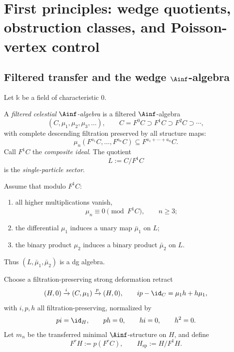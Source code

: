 \section{First principles: wedge quotients, obstruction classes, and Poisson-vertex control}
\label{sec:cbt-first-principles}

\subsection{Filtered transfer and the wedge $\Ainf$-algebra}
\label{sec:cbt-filtered-transfer}

Let $\mathbb{k}$ be a field of characteristic $0$.

\begin{definition}
\label{def:cbt-filtered-celestial}
A \emph{filtered celestial $\Ainf$-algebra} is a filtered $\Ainf$-algebra
\[
(C,\mu_1,\mu_2,\mu_3,\ldots),
\qquad
C=F^0C\supset F^1C\supset F^2C\supset \cdots,
\]
with complete descending filtration preserved by all structure maps:
\[
\mu_n(F^{a_1}C,\dots,F^{a_n}C)\subseteq F^{a_1+\cdots+a_n}C.
\]
Call $F^1C$ the \emph{composite ideal}. The quotient
\[
L:=C/F^1C
\]
is the \emph{single-particle sector}.
\end{definition}

Assume that modulo $F^1C$:
\begin{enumerate}[label=\textup{(\roman*)},leftmargin=2em]
\item all higher multiplications vanish,
\[
\mu_n\equiv 0 \pmod{F^1C},
\qquad n\geq 3;
\]
\item the differential $\mu_1$ induces a unary map $\bar\mu_1$ on $L$;
\item the binary product $\mu_2$ induces a binary product $\bar\mu_2$ on $L$.
\end{enumerate}
Thus $(L,\bar\mu_1,\bar\mu_2)$ is a dg algebra.

Choose a filtration-preserving strong deformation retract
\[
(H,0)\xrightarrow{i}(C,\mu_1)\xrightarrow{p}(H,0),
\qquad
ip-\id_C=\mu_1 h+h\mu_1,
\]
with $i,p,h$ all filtration-preserving, normalized by
\[
p i=\id_H,\qquad p h=0,\qquad h i=0,\qquad h^2=0.
\]
Let $m_n$ be the transferred minimal $\Ainf$-structure on $H$, and define
\[
F^rH:=p(F^rC),
\qquad
H_{\mathrm{sp}}:=H/F^1H.
\]

